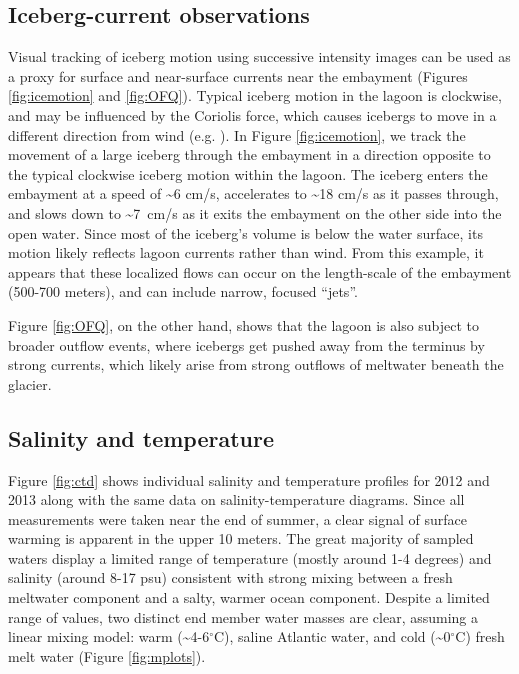 % 


\subsection{Iceberg-current observations}
Visual tracking of iceberg motion using successive intensity images can be used as a proxy for surface and near-surface currents near the embayment (Figures \ref{fig:icemotion} and \ref{fig:OFQ}). Typical iceberg motion in the lagoon is clockwise, and may be influenced by the Coriolis force, which causes icebergs to move in a different direction from wind (e.g. \citet{jacka1991antarctic,hulbe}). In Figure \ref{fig:icemotion}, we track the movement of a large iceberg through the embayment in a direction opposite to the typical clockwise iceberg motion within the lagoon. The iceberg enters the embayment at a speed of \textasciitilde6 cm/s, accelerates to \textasciitilde18 cm/s as it passes through, and slows down to \textasciitilde7~cm/s as it exits the embayment on the other side into the open water. Since  most of the iceberg's volume is below the water surface, its motion likely reflects lagoon currents rather than wind. From this example, it appears that these localized flows can occur on the length-scale of the embayment (500-700 meters), and can include narrow, focused ``jets''. 

Figure \ref{fig:OFQ}, on the other hand, shows that the lagoon is also subject to broader outflow events, where icebergs get pushed away from the terminus by strong currents, which likely arise from strong outflows of meltwater beneath the glacier. 





\subsection{Salinity and temperature}
Figure \ref{fig:ctd} shows individual salinity and temperature profiles for 2012 and 2013 along with the same data on salinity-temperature diagrams.  Since all measurements were taken near the end of summer, a clear signal of surface warming is apparent in the upper 10 meters. The great majority of sampled waters display a limited range of temperature (mostly around 1-4 degrees) and salinity (around 8-17 psu) consistent with strong mixing between a fresh meltwater component and a salty, warmer ocean component. Despite a limited range of values, two distinct end member water masses are clear, assuming a linear mixing model: warm (\textasciitilde 4-6$^{\circ}$C), saline Atlantic water, and cold (\textasciitilde 0$^{\circ}$C) fresh melt water (Figure \ref{fig:mplots}). 


